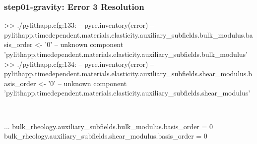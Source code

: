 \documentclass[aspectratio=169]{beamer}
\begin{document}
\begin{frame}[t,fragile]
  \frametitle{{\ttfamily step01-gravity}: Error 3 Resolution}

  \tserror
  \begin{bashcode}
 >> ./pylithapp.cfg:133:
 -- pyre.inventory(error)
 -- pylithapp.timedependent.materials.elasticity.auxiliary_subfields.bulk_modulus.basis_order <- '0'
 -- unknown component 'pylithapp.timedependent.materials.elasticity.auxiliary_subfields.bulk_modulus'
 >> ./pylithapp.cfg:134:
 -- pyre.inventory(error)
 -- pylithapp.timedependent.materials.elasticity.auxiliary_subfields.shear_modulus.basis_order <- '0'
 -- unknown component 'pylithapp.timedependent.materials.elasticity.auxiliary_subfields.shear_modulus'
  \end{bashcode}

  \pause\\[1pt]

  \begin{cfgcode}
    ...
    bulk_rheology.auxiliary_subfields.bulk_modulus.basis_order = 0
    bulk_rheology.auxiliary_subfields.shear_modulus.basis_order = 0
  \end{cfgcode}

\end{frame}
\end{document}
